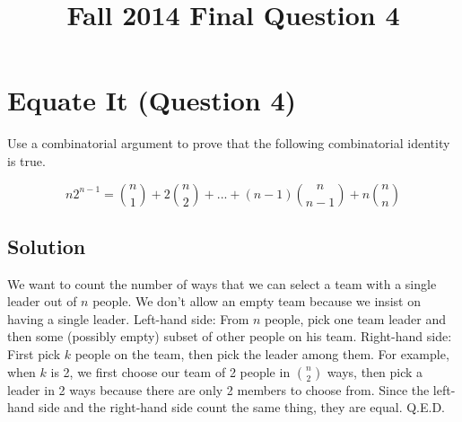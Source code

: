 \documentclass{article}
\title{Fall 2014 Final Question 4}
\begin{document}
\maketitle

\section{Equate It (Question 4)}
Use a combinatorial argument to prove that the following combinatorial identity is true.

$$n2^{n-1} = {n \choose 1} + 2 {n \choose 2} + ... + (n-1) {n \choose n-1} + n {n \choose n}$$

\subsection{Solution}
We want to count the number of ways that we can select a team with a single leader out of $n$ people. We don’t allow an empty team because we insist on having a single leader.
\newline Left-hand side: From $n$ people, pick one team leader and then some (possibly empty) subset of other people on his team.
\newline Right-hand side: First pick $k$ people on the team, then pick the leader among them. For example, when $k$ is 2, we first choose our team of 2 people in $n \choose 2$ ways, then pick a leader in 2 ways because there are only 2 members to choose from.
\newline Since the left-hand side and the right-hand side count the same thing, they are equal. Q.E.D.
\end{document}
